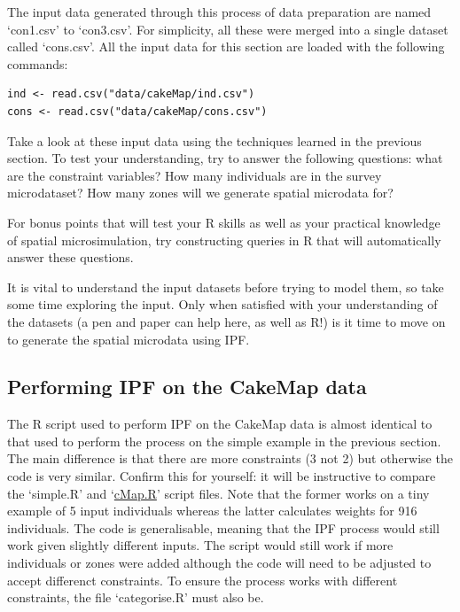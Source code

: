 \documentclass[a4paper, 11pt, twoside]{article}
\begin{document}
The input data generated through this process of data preparation are named
`con1.csv' to `con3.csv'. For simplicity, all these were merged into a single
dataset called `cons.csv'. All the input data for this section
are loaded with the following commands:

\begin{lstlisting}[float=h, caption={Loading the input data for CakeMap (see `cMap.R')}]
ind <- read.csv("data/cakeMap/ind.csv")
cons <- read.csv("data/cakeMap/cons.csv")
\end{lstlisting}

Take a look at these input data using the techniques learned in the previous
section. To test your understanding, try to answer the following questions:
what are the constraint variables? How many individuals are in the survey microdataset?
How many zones will we generate spatial microdata for?

For bonus points that will test your R skills as well as your practical knowledge
of spatial microsimulation, try constructing queries in R that will automatically
answer these questions.

It is vital to understand the input datasets before trying to model them, so
take some time exploring the input. Only when satisfied with your understanding of
the datasets (a pen and paper can help here, as well as R!) is it time
to move on to generate the spatial microdata using IPF.

\subsection{Performing IPF on the CakeMap data}
\label{sipfcake}
The R script used to perform IPF on the CakeMap data is almost identical to
that used to perform the process on the simple example in the previous section.
The main difference is that there are more constraints (3 not 2) but otherwise
the code is very similar.  Confirm this for yourself: it will be instructive
to compare the `simple.R' and
`\href{https://github.com/Robinlovelace/smsim-course/blob/master/cMap.R}{cMap.R}'
script files. Note that
the former works on a tiny example of 5 input individuals whereas the latter
calculates weights for 916 individuals. The code is generalisable, meaning
that the IPF process would still work given slightly different inputs.
The script would still work if more individuals or zones were added although
the code will need to be adjusted to accept differenct constraints.
To ensure the process works with different
constraints, the file `categorise.R' must also be.
\end{document}
